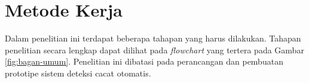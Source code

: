 \vspace{1em}

\section{Metode Kerja}
Dalam penelitian ini terdapat beberapa tahapan yang harus dilakukan.
Tahapan penelitian secara lengkap dapat dilihat pada
\textit{flowchart} yang tertera pada
Gambar \ref{fig:bagan-umum}. Penelitian ini dibatasi pada perancangan
dan pembuatan prototipe sistem deteksi cacat otomatis.


